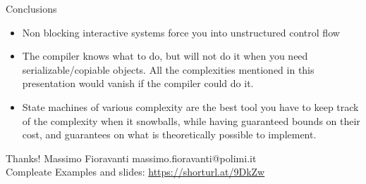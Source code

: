 \documentclass[aspectratio=169,11pt]{beamer}
\begin{document}
\begin{frame}{Conclusions}
    \begin{itemize}
        \item Non blocking interactive systems force you into unstructured control flow
        \item The compiler knows what to do, but will not do it when you need serializable/copiable objects. All the complexities mentioned in this presentation would vanish if the compiler could do it.
        \item State machines of various complexity are the best tool you have to keep track of the complexity when it snowballs, while having guaranteed bounds on their cost, and guarantees on what is theoretically possible to implement.
    \end{itemize}
\end{frame}



\begin{frame}{Thanks!}
  Massimo Fioravanti massimo.fioravanti@polimi.it \\
  Compleate Examples and slides: \href{https://shorturl.at/9DkZw}{https://shorturl.at/9DkZw}
\end{frame}
\end{document}
